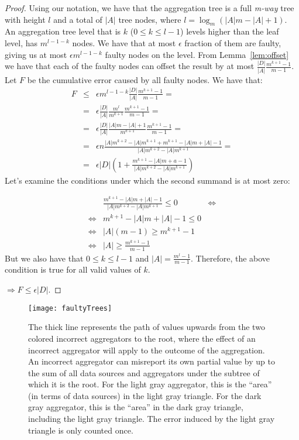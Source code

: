 \documentclass[11pt,twocolumn]{MyTightStyle}
\theoremstyle{plain}
\theoremstyle{definition}
\theoremstyle{remark}
\numberwithin{equation}{section}
\begin{document}
\begin{proof}
Using our notation, we have that the aggregation tree is a
full \emph{m-way} tree with height $l$ and a total of $|A|$ tree nodes, where
$l = \log_m(|A|m-|A|+1)$. An aggregation tree level that is $k$ ($0 \leq
k \leq l-1$) levels higher than the leaf level, has $m^{l-1-k}$ nodes. We
have that at most $\epsilon$ fraction of them are faulty, giving us at
most $\epsilon m^{l-1-k}$ faulty nodes on the level. From
Lemma~\ref{lem:offset} we have that each of the faulty nodes can
offset the result by at most  $\frac{|D|}{|A|}\frac{m^{k+1} -1}{m-1}$. Let
$F$ be the cumulative error caused by all faulty nodes. We have
that:
\begin{eqnarray*}
F &\leq& \epsilon m^{l-1-k} \frac{|D|}{|A|}\frac{m^{k+1}-1}{m-1}=\\
&=& \epsilon \frac{|D|}{|A|}\frac{m^l}{m^{k+1}}\frac{m^{k+1}-1}{m-1}=\\
&=& \epsilon \frac{|D|}{|A|}\frac{|A|m-|A|+1}{m^{k+1}}\frac{m^{k+1}-1}{m-1}=\\
&=& \epsilon n\frac{|A|m^{k+2} - |A|m^{k+1} + m^{k+1} - |A|m + |A|
  -1}{|A|m^{k+2} - |A|m^{k+1}}=\\
&=& \epsilon |D| (1 + \frac{m^{k+1}-|A|m + a -1}{|A|m^{k+2} - |A|m^{k+1}})
\end{eqnarray*}
Let's examine the conditions under which the second summand
is at most zero:

\begin{eqnarray*}
&\frac{m^{k+1}-|A|m + |A| -1}{|A|m^{k+2} - |A|m^{k+1}} \leq 0 &\Leftrightarrow\\
\Leftrightarrow&m^{k+1}-|A|m + |A| -1 \leq 0&\\
\Leftrightarrow& |A|(m-1) \geq m^{k+1}-1&\\
\Leftrightarrow& |A| \geq \frac{m^{k+1}-1}{m-1}&
\end{eqnarray*}
But we also have that $0 \leq k \leq l-1$ and $|A| =
\frac{m^l-1}{m-1}$. Therefore, the above condition is true for all
valid values of $k$.

$\Rightarrow F \leq \epsilon |D|$.
\end{proof}



\begin{figure}
\begin{center}
\texttt{[image: faultyTrees]}
\caption{\label{fig:faultyTrees} The thick line represents the path of
  values upwards from the two colored incorrect aggregators to the root,
  where the effect of an incorrect aggregator will apply to the outcome
  of the aggregation.  An incorrect aggregator can misreport its own
  partial value by up to the sum of all data sources and aggregators
  under the subtree of which it is the root.  For the light gray
  aggregator, this is the ``area'' (in terms of data sources) in the
  light gray triangle. For the dark gray aggregator, this is the
  ``area'' in the dark gray triangle, including the light gray triangle.
  The error induced by the light gray triangle is only counted once.}
\end{center}
\end{figure}
\end{document}
